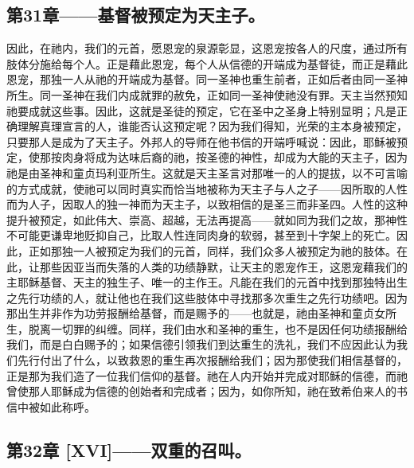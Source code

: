 
\subsection{第31章——基督被预定为天主子。}

因此，在祂内，我们的元首，愿恩宠的泉源彰显，这恩宠按各人的尺度，通过所有肢体分施给每个人。正是藉此恩宠，每个人从信德的开端成为基督徒，而正是藉此恩宠，那独一人从祂的开端成为基督。同一圣神也重生前者，正如后者由同一圣神所生。同一圣神在我们内成就罪的赦免，正如同一圣神使祂没有罪。天主当然预知祂要成就这些事。因此，这就是圣徒的预定，它在圣中之圣身上特别显明；凡是正确理解真理宣言的人，谁能否认这预定呢？因为我们得知，光荣的主本身被预定，只要那人是成为了天主子。外邦人的导师在他书信的开端呼喊说：因此，耶稣被预定，使那按肉身将成为达味后裔的祂，按圣德的神性，却成为大能的天主子，因为祂是由圣神和童贞玛利亚所生。这就是天主圣言对那唯一的人的提拔，以不可言喻的方式成就，使祂可以同时真实而恰当地被称为天主子与人之子——因所取的人性而为人子，因取人的独一神而为天主子，以致相信的是圣三而非圣四。人性的这种提升被预定，如此伟大、崇高、超越，无法再提高——就如同为我们之故，那神性不可能更谦卑地贬抑自己，比取人性连同肉身的软弱，甚至到十字架上的死亡。因此，正如那独一人被预定为我们的元首，同样，我们众多人被预定为祂的肢体。在此，让那些因亚当而失落的人类的功绩静默，让天主的恩宠作王，这恩宠藉我们的主耶稣基督、天主的独生子、唯一的主作王。凡能在我们的元首中找到那独特出生之先行功绩的人，就让他也在我们这些肢体中寻找那多次重生之先行功绩吧。因为那出生并非作为功劳报酬给基督，而是赐予的——也就是，祂由圣神和童贞女所生，脱离一切罪的纠缠。同样，我们由水和圣神的重生，也不是因任何功绩报酬给我们，而是白白赐予的；如果信德引领我们到达重生的洗礼，我们不应因此认为我们先行付出了什么，以致救恩的重生再次报酬给我们；因为那使我们相信基督的，正是那为我们造了一位我们信仰的基督。祂在人内开始并完成对耶稣的信德，而祂曾使那人耶稣成为信德的创始者和完成者；因为，如你所知，祂在致希伯来人的书信中被如此称呼。\par


\subsection{第32章 [XVI]——双重的召叫。}

